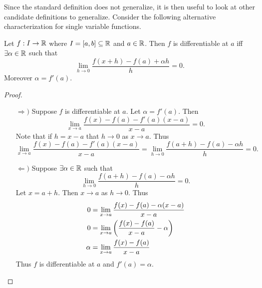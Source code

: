 \documentclass[../main.tex]{subfiles}
\begin{document}
Since the standard definition does not generalize, it is then useful to look at other candidate definitions to generalize. Consider the following alternative characterization for single variable functions.

\begin{theorem}
    Let $f : I \to \mathbb{R}$ where $I = [a,b] \subseteq \mathbb{R}$ and $a \in \mathbb{R}$. Then $f$ is differentiable at $a$ iff $\exists \alpha \in \mathbb{R}$ such that
    \[
        \lim_{h \to 0} \frac{f(x+h) - f(a) + \alpha h}{h} = 0
    .\]
    Moreover $\alpha = f'(a)$.
\end{theorem}

\begin{proof}
    \begin{enumerate}
        \item[$\Rightarrow)$]
            Suppose $f$ is differentiable at $a$. Let $\alpha = f'(a)$. Then
            \[
                \lim_{x \to a} \frac{f(x) - f(a) - f'(a) (x-a)}{x-a} = 0
            .\]
            Note that if $h = x-a$ that $h \to 0$ as $x \to a$. Thus
            \[
                \lim_{x \to a} \frac{f(x) - f(a) - f'(a) (x-a)}{x-a} =
                \lim_{h \to 0} \frac{f(a + h) - f(a) - \alpha h}{h} = 0
            .\]
        \item[$\Leftarrow)$]
            Suppose $\exists \alpha \in \mathbb{R}$ such that
            \[
                \lim_{h \to 0} \frac{f(a + h) - f(a) - \alpha h}{h} = 0
            .\]
            Let $x = a + h$. Then $x \to a$ as $h \to 0$. Thus
            \begin{align*}
                0      &= \lim_{x \to a} \frac{f(x) - f(a) - \alpha (x-a)}{x-a} \\
                0      &= \lim_{x \to a} \qty(\frac{f(x) - f(a)}{x-a} - \alpha) \\
                \alpha &= \lim_{x \to a} \frac{f(x) - f(a)}{x-a}
            \end{align*}
            Thus $f$ is differentiable at $a$ and $f'(a) = \alpha$.
    \end{enumerate}
\end{proof}
\end{document}
